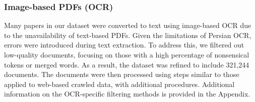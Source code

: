 \subsubsection{Image-based PDFs (OCR)}
Many papers in our dataset were converted to text using image-based OCR due to the unavailability of text-based PDFs. Given the limitations of Persian OCR, errors were introduced during text extraction. To address this, we filtered out low-quality documents, focusing on those with a high percentage of nonsensical tokens or merged words. As a result, the dataset was refined to include 321,244 documents. The documents were then processed using steps  similar to those applied to web-based crawled data, with additional procedures. Additional information on the OCR-specific filtering methods is provided in the Appendix.